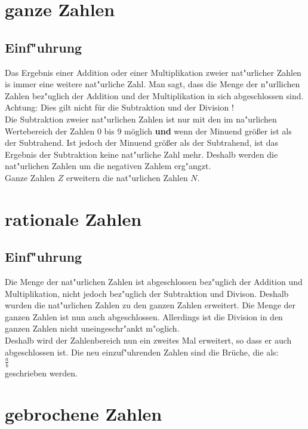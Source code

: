 \section{ganze Zahlen}
\subsection{Einf"uhrung}
Das Ergebnis einer Addition oder einer Multiplikation zweier nat"urlicher Zahlen
is immer eine weitere nat"urliche Zahl. Man sagt, dass die Menge der n"urllichen Zahlen
bez"uglich der Addition und der Multiplikation in sich abgeschlossen sind.
Achtung: Dies gilt nicht für die Subtraktion und der Division !\\
Die Subtraktion zweier nat"urlichen Zahlen ist nur mit den im na"urlichen Wertebereich
der Zahlen 0 bis 9 möglich \textbf{und} wenn der Minuend größer ist als der Subtrahend.
Ist jedoch der Minuend größer als der Subtrahend, ist das Ergebnis der Subtraktion keine
nat"urliche Zahl mehr. Deshalb werden die nat"urlichen Zahlen um die negativen Zahlem
erg"angzt.\\
Ganze Zahlen $Z$ erweitern die nat"urlichen Zahlen $N$.

\section{rationale Zahlen}
\subsection{Einf"uhrung}
Die Menge der nat"urlichen Zahlen ist abgeschlossen bez"uglich der Addition und Multiplikation,
nicht jedoch bez"uglich der Subtraktion und Divison. Deshalb wurden die nat"urlichen Zahlen zu
den ganzen Zahlen erweitert. Die Menge der ganzen Zahlen ist nun auch abgeschlossen. Allerdings
ist die Division in den ganzen Zahlen nicht uneingeschr"ankt m"oglich.\\
Deshalb wird der Zahlenbereich nun ein zweites Mal erweitert, so dass er auch abgeschlossen ist.
Die neu einzuf"uhrenden Zahlen sind die Brüche, die als:\\
$\frac{a}{b}$ \\
geschrieben werden.

\section{gebrochene Zahlen}
